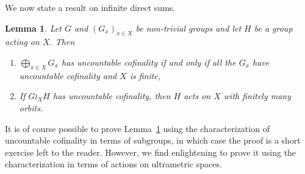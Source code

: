 \documentclass[a4paper]{article}
\newcommand{\PHInline}[1]{\todo[color={blue!33},size=small,inline]{\textbf{PH :} #1}}
\newtheorem{lem}{Lemma}[section]
\theoremstyle{definition}
\newcommand*{\BS}{B\textbf{S}}
\begin{document}
We now state a result on infinite direct sums.
%
%
\begin{lem}\label{Lemma:Cof}
Let $G$ and $(G_x)_{x\in X}$ be non-trivial groups and let $H$ be a group acting on $X$.
 Then
\begin{enumerate}
\item $\bigoplus_{x\in X}G_x$ has uncountable cofinality if and only if all the $G_x$ have uncountable cofinality and $X$ is finite,
\item If $G\wr_XH$ has uncountable cofinality, then $H$ acts on $X$ with finitely many orbits.
\end{enumerate}
\end{lem}
%
%
It is of course possible to prove Lemma~\ref{Lemma:Cof} using the characterization of uncountable cofinality in terms of subgroups, in which case the proof is a short exercise left to the reader. However, we find enlightening to prove it using the characterization in terms of actions on ultrametric spaces.
%
%
\end{document}

